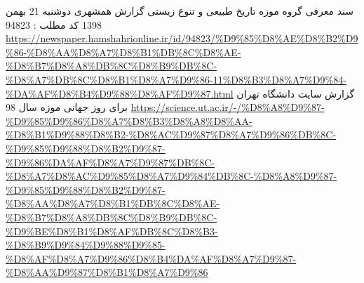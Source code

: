 
\renewcommand\bibname{فهرست مراجع}
\begin{thebibliography}{9} \label{chapter:references}


	 سند معرفی گروه موزه تاریخ طبیعی و تنوع زیستی
	 گزارش همشهری دوشنبه 21 بهمن 1398 کد مطلب :  94823 \url{https://newspaper.hamshahrionline.ir/id/94823/%D9%85%D8%AE%D8%B2%D9%86-%D8%AA%D8%A7%D8%B1%DB%8C%D8%AE-%D8%B7%D8%A8%DB%8C%D8%B9%DB%8C-%D8%A7%DB%8C%D8%B1%D8%A7%D9%86-11%D8%B3%D8%A7%D9%84-%DA%AF%D8%B4%D9%88%D8%AF%D9%87.html}
	  گزارش سایت دانشگاه تهران برای روز جهانی موزه سال 98 \url{https://science.ut.ac.ir/-/%D8%A8%D9%87-%D9%85%D9%86%D8%A7%D8%B3%D8%A8%D8%AA-%D8%B1%D9%88%D8%B2-%D8%AC%D9%87%D8%A7%D9%86%DB%8C-%D9%85%D9%88%D8%B2%D9%87-%D9%86%DA%AF%D8%A7%D9%87%DB%8C-%D8%A7%D8%AC%D9%85%D8%A7%D9%84%DB%8C-%D8%A8%D9%87-%D9%85%D9%88%D8%B2%D9%87-%D8%AA%D8%A7%D8%B1%DB%8C%D8%AE-%D8%B7%D8%A8%DB%8C%D8%B9%DB%8C-%D9%BE%D8%B1%D8%AF%DB%8C%D8%B3-%D8%B9%D9%84%D9%88%D9%85-%D8%AF%D8%A7%D9%86%D8%B4%DA%AF%D8%A7%D9%87-%D8%AA%D9%87%D8%B1%D8%A7%D9%86}


\end{thebibliography}